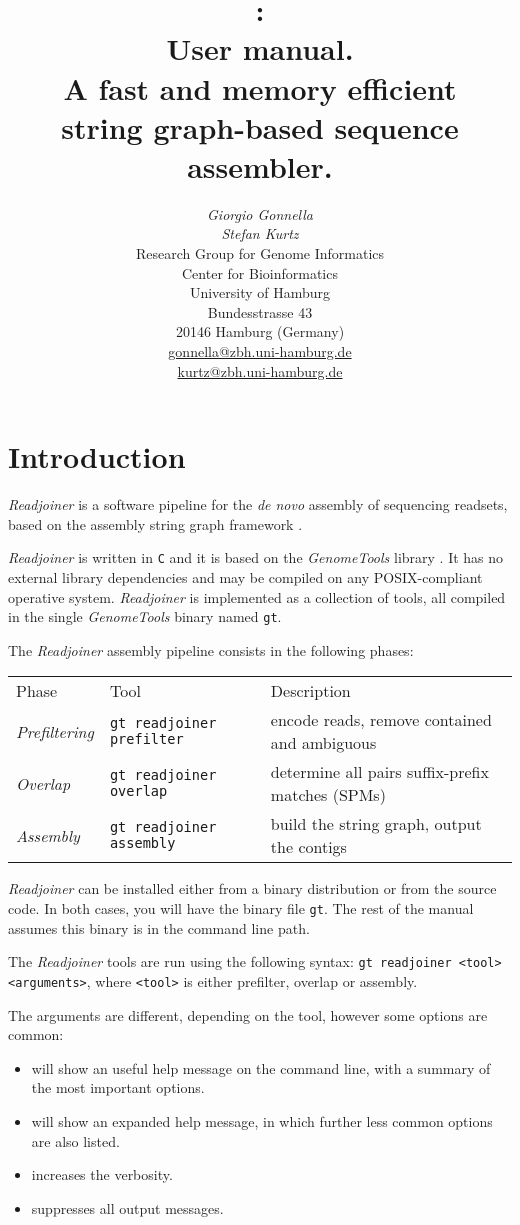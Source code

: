 \documentclass[12pt,titlepage]{article}
\title{\Huge{\Readjoiner 1.2:\\ User manual.}\\[3mm]
\Large{A fast and memory efficient \\string
 graph-based sequence assembler.}}
\author{\begin{tabular}{c}
         \textit{Giorgio Gonnella}\\
         \textit{Stefan Kurtz}\\[2cm]
         Research Group for Genome Informatics\\
         Center for Bioinformatics\\
         University of Hamburg\\
         Bundesstrasse 43\\
         20146 Hamburg (Germany)\\[1cm]
         \url{gonnella@zbh.uni-hamburg.de}\\
         \url{kurtz@zbh.uni-hamburg.de}\\[1cm]
        \end{tabular}}
\newcommand{\GenomeTools}{\textit{GenomeTools}\xspace}
\newcommand{\Readjoiner}{\textit{Readjoiner}\xspace}
\newcommand{\Gtcmd}{\texttt{gt}\xspace}
\newcommand{\Rdjprefiltercmd}{\texttt{gt readjoiner prefilter}\xspace}
\newcommand{\Rdjoverlapcmd}{\texttt{gt readjoiner overlap}\xspace}
\newcommand{\Rdjassemblycmd}{\texttt{gt readjoiner assembly}\xspace}
\begin{document}
\maketitle

\section{Introduction} \label{Introduction}

\Readjoiner is a software pipeline for the \textit{de novo} assembly of
 sequencing readsets, based on the assembly string graph framework
  \cite{MYE:2005}.

\Readjoiner is written in \texttt{C} and it is based on the
\GenomeTools library \cite{genometools}. It has no external library
dependencies and may be compiled on any POSIX-compliant operative system.
 \Readjoiner is implemented as a collection of tools, all compiled in the single
\GenomeTools binary named \Gtcmd.

The \Readjoiner assembly pipeline consists in the following phases:\\[3mm]
\begin{tabular}{lll}
Phase & Tool & Description \\
\textit{Prefiltering} & \Rdjprefiltercmd &
  encode reads, remove contained and ambiguous\\
\textit{Overlap}   & \Rdjoverlapcmd &
  determine all pairs suffix-prefix matches (SPMs) \\
\textit{Assembly}  & \Rdjassemblycmd &
 build the string graph, output the contigs \\
\end{tabular}

\Readjoiner can be installed either from a binary distribution or from the
source code. In both cases, you will have the binary file \texttt{gt}.
The rest of the manual assumes this binary is in the command line path.

The \Readjoiner tools are run using the following syntax:
\texttt{gt readjoiner <tool> <arguments>}, where \texttt{<tool>}
is either prefilter, overlap or assembly.

The arguments are different,
depending on the tool, however some options are common:
\begin{itemize}
\item {} will show an useful help message on the command
line, with a summary of the most important options.
\item {} will show an expanded help message, in which
further less common options are also listed.
\item {} increases the verbosity.
\item {} suppresses all output messages.
\end{itemize}
\end{document}
